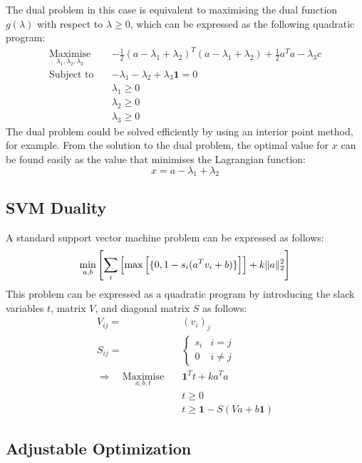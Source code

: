 The dual problem in this case is equivalent to maximising the dual function $g(\lambda)$ with respect to $\lambda\ge0$, which can be expressed as the following quadratic program:
\begin{align*}
    \underset{\lambda_1, \lambda_2, \lambda_3}{\text{Maximise}} \quad & -\frac{1}{2}(a - \lambda_1 + \lambda_2)^T(a - \lambda_1 + \lambda_2) + \frac{1}{2}a^Ta - \lambda_3c \\
    \text{Subject to} \quad & -\lambda_1 - \lambda_2 + \lambda_3\mathbf{1} = 0 \\
    & \lambda_1 \ge 0 \\
    & \lambda_2 \ge 0 \\
    & \lambda_3 \ge 0
\end{align*}
The dual problem could be solved efficiently by using an interior point method, for example. From the solution to the dual problem, the optimal value for $x$ can be found easily as the value that minimises the Lagrangian function:
\begin{equation*}
    x = a - \lambda_1 + \lambda_2
\end{equation*}

\subsection{SVM Duality}
A standard support vector machine problem can be expressed as follows:
\begin{equation*}
    \min_{a, b}{\left[ \sum_i{\Bigl[ \max{ \Bigl[ \{ 0, 1-s_i(a^Tv_i + b) \} \Bigl] } \Bigl]} + k\Vert a \Vert_2^2 \right]}
\end{equation*}
This problem can be expressed as a quadratic program by introducing the slack variables $t$, matrix $V$, and diagonal matrix $S$ as follows:
\begin{align*}
    V_{ij} = &(v_i)_j \\
    S_{ij} = &\begin{cases}
        s_i & i = j \\
        0 & i \ne j
    \end{cases} \\
    \Rightarrow \quad \underset{a, b, t}{\text{Maximise}} \quad & \mathbf{1}^T t + k a^T a \\
    & t \ge 0 \\
    & t \ge \mathbf{1} - S(Va + b\mathbf{1})
\end{align*}

\subsection{Adjustable Optimization}
